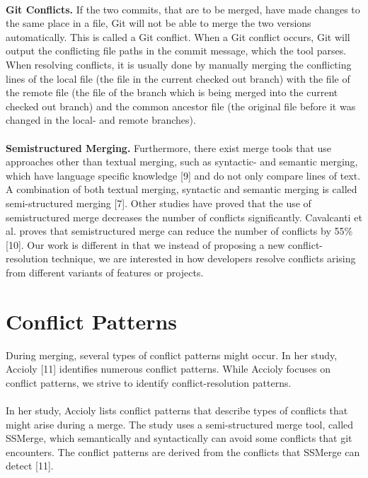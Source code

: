 \paragraph*{}
\textbf{Git Conflicts.} If the two commits, that are to be merged, have made changes to the same place in a file, Git will not be able to merge the two versions automatically. This is called a Git conflict. When a Git conflict occurs, Git will output the conflicting file paths in the commit message, which the tool parses. When resolving conflicts, it is usually done by manually merging the conflicting lines of the local file (the file in the current checked out branch) with the file of the remote file (the file of the branch which is being merged into the current checked out branch) and the common ancestor file (the original file before it was changed in the local- and remote branches).

\paragraph*{}
\textbf{Semistructured Merging.} Furthermore, there exist merge tools that use approaches other than textual merging, such as syntactic- and semantic merging, which have language specific knowledge [9] and do not only compare lines of text. A combination of both textual merging, syntactic and semantic merging is called semi-structured merging [7]. Other studies have proved that the use of semistructured merge decreases the number of conflicts significantly. Cavalcanti et al. proves that semistructured merge can reduce the number of conflicts by 55\% [10]. Our work is different in that we instead of proposing a new conflict-resolution technique, we are interested in how developers resolve conflicts arising from different variants of features or projects.

\section{Conflict Patterns}
During merging, several types of conflict patterns might occur. In her study, Accioly [11] identifies numerous conflict patterns. While Accioly focuses on conflict patterns, we strive to identify conflict-resolution patterns.
\paragraph*{}
In her study, Accioly lists conflict patterns that describe types of conflicts that might arise during a merge. The study uses a semi-structured merge tool, called SSMerge, which semantically and syntactically can avoid some conflicts that git encounters. The conflict patterns are derived from the conflicts that SSMerge can detect [11].
